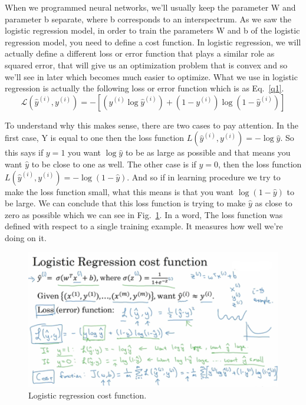 \documentclass[a4paper]{article}
\begin{document}
When we programmed neural networks, we'll usually keep the parameter W and parameter b separate, where b corresponds to an interspectrum. As we saw the logistic regression model, in order to train the parameters W and b of the logistic regression model, you need to define a cost function. In logistic regression, we will actually define a different loss or error function that plays a similar role as squared error, that will give us an optimization problem that is convex and so we'll see in later which becomes much easier to optimize. What we use in logistic regression is actually the following loss or error function which is as Eq.~\ref{q1}.
\begin{equation}
\mathcal{L}(\hat{y}^{(i)},y^{(i)})=-[(y^{(i)}\log \hat{y}^{(i)})+(1-y^{(i)})\log(1-\hat{y}^{(i)})]   \label{q1}
\end{equation}

To understand why this makes sense, there are two cases to pay attention. In the first case, Y is equal to one then the loss function $L(\hat{y}^{(i)},y^{(i)})=-\log \hat{y}$. So this says if $y = 1$ you want $\log \hat{y}$ to be as large as possible and that means you want $\hat{y}$ to be close to one as well. The other case is if $y = 0$, then the loss function $L(\hat{y}^{(i)},y^{(i)})=-\log(1-\hat{y})$. And so if in learning procedure we try to make the loss function small, what this means is that you want $\log(1-\hat{y})$ to be large. We can conclude that this loss function is trying to make $\hat{y}$ as close to zero as possible which we can see in Fig.~\ref{p4}. In a word, The loss function was defined with respect to a single training example. It measures how well we're doing on it. 
\begin{figure}
	\begin{center}
		\includegraphics[scale=0.4]{figures/5.png}
	\end{center}
	\caption{Logistic regression cost function.}
	\label{p4}
\end{figure}
\end{document}
